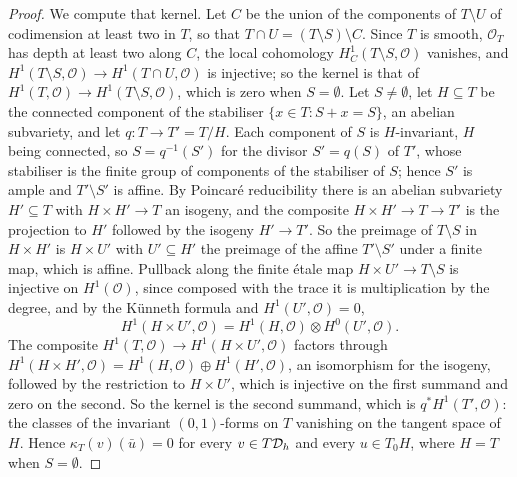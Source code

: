 \begin{proof}
We compute that kernel. Let $C$ be the union of the components of $T\setminus U$ of codimension at least two in $T$, so that $T\cap U=(T\setminus S)\setminus C$. Since $T$ is smooth, $\mathcal{O}_{T}$ has depth at least two along $C$, the local cohomology $H^{1}_{C}(T\setminus S,\mathcal{O})$ vanishes, and $H^{1}(T\setminus S,\mathcal{O})\to H^{1}(T\cap U,\mathcal{O})$ is injective; so the kernel is that of $H^{1}(T,\mathcal{O})\to H^{1}(T\setminus S,\mathcal{O})$, which is zero when $S=\emptyset$. Let $S\ne\emptyset$, let $H\subseteq T$ be the connected component of the stabiliser $\{x\in T:S+x=S\}$, an abelian subvariety, and let $q\colon T\to T'=T/H$. Each component of $S$ is $H$-invariant, $H$ being connected, so $S=q^{-1}(S')$ for the divisor $S'=q(S)$ of $T'$, whose stabiliser is the finite group of components of the stabiliser of $S$; hence $S'$ is ample \cite[\S6, Application~1]{Mum70} and $T'\setminus S'$ is affine. By Poincar\'e reducibility there is an abelian subvariety $H'\subseteq T$ with $H\times H'\to T$ an isogeny, and the composite $H\times H'\to T\to T'$ is the projection to $H'$ followed by the isogeny $H'\to T'$. So the preimage of $T\setminus S$ in $H\times H'$ is $H\times U'$ with $U'\subseteq H'$ the preimage of the affine $T'\setminus S'$ under a finite map, which is affine. Pullback along the finite \'etale map $H\times U'\to T\setminus S$ is injective on $H^{1}(\mathcal{O})$, since composed with the trace it is multiplication by the degree, and by the K\"unneth formula and $H^{1}(U',\mathcal{O})=0$,
\[
H^{1}(H\times U',\mathcal{O})=H^{1}(H,\mathcal{O})\otimes H^{0}(U',\mathcal{O}).
\]
The composite $H^{1}(T,\mathcal{O})\to H^{1}(H\times U',\mathcal{O})$ factors through $H^{1}(H\times H',\mathcal{O})=H^{1}(H,\mathcal{O})\oplus H^{1}(H',\mathcal{O})$, an isomorphism for the isogeny, followed by the restriction to $H\times U'$, which is injective on the first summand and zero on the second. So the kernel is the second summand, which is $q^{*}H^{1}(T',\mathcal{O})$: the classes of the invariant $(0,1)$-forms on $T$ vanishing on the tangent space of $H$. Hence $\kappa_{T}(v)(\bar u)=0$ for every $v\in T\mathcal{D}_{h}$ and every $u\in T_{0}H$, where $H=T$ when $S=\emptyset$.


\end{proof}

